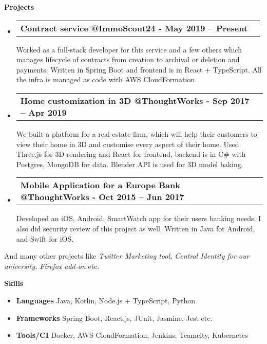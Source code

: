 \documentclass[letterpaper,12pt]{article}[leftmargin=*]
\makeatletter
\def \entryspacing {-0pt}
\renewcommand{\section}[2]{\vspace{5pt}
  \colorbox{secondary}{\color{white}\raggedbottom\normalsize\textbf{{#1}{\hspace{7pt}#2}}}
}
\newcommand{\resumeEntryStart}{\begin{itemize}[leftmargin=2.5mm]}
\newcommand{\resumeEntryEnd}{\end{itemize}\vspace{\entryspacing}}
\newcommand{\resumeEntryTD}[2]{
  \vspace{-1pt}\item[]
    \begin{tabularx}{0.97\textwidth}{X@{\hspace{60pt}}r}
      \textbf{\color{primary}#1} & {\firabook\color{accent}\small#2} \\
    \end{tabularx}\vspace{-6pt}
}
\newcommand{\resumeEntryS}[2]{
  \item[]\small{
    \textbf{\color{primary}#1 }{ #2 \vspace{-6pt}}
  }
}
\makeatother
\begin{document}
\section{\faFlask}{Projects}

  \resumeEntryStart
    \resumeEntryTD
      {Contract service @ImmoScout24 {\normalfont - May 2019 -- Present}}{}
      \begin{flushleft}\small
      Worked as a full-stack developer for this service and a few others which manages lifecycle of contracts from creation to archival or deletion and payments. Written in Spring Boot and frontend is in React + TypeScript. All the infra is managed as code with AWS CloudFormation.
      \end{flushleft}
  \resumeEntryEnd

  \resumeEntryStart
    \resumeEntryTD
      {Home customization in 3D @ThoughtWorks {\normalfont - Sep 2017 -- Apr 2019}}{}
      \begin{flushleft}\small
      We built a platform for a real-estate firm, which will help their customers to view their home in 3D and customise every aspect of their home. Used Three.js for 3D rendering and React for frontend, backend is in C\# with Postgres, MongoDB for data. Blender API is used for 3D model baking.
      \end{flushleft}
  \resumeEntryEnd

  \resumeEntryStart
    \resumeEntryTD
      {Mobile Application for a Europe Bank @ThoughtWorks {\normalfont - Oct 2015 -- Jun 2017}}{}
    \begin{flushleft}\small
    Developed an iOS, Android, SmartWatch app for their users banking needs. I also did security review of this project as well. Written in Java for Android, and Swift for iOS.
    \end{flushleft}
  \resumeEntryEnd

  \begin{adjustwidth}{2.5mm}{2.5mm}\small
  {And many other projects like \textit{Twitter Marketing tool, Central Identity for our university, Firefox add-on} etc.}
  \end{adjustwidth}
  \vspace{4pt}

\section{\faGears}{Skills}
  \resumeEntryStart
  \resumeEntryS{Languages} {Java, Kotlin, Node.js + TypeScript, Python}
  \resumeEntryS{Frameworks} {Spring Boot, React.js, JUnit, Jasmine, Jest etc.}
  \resumeEntryS{Tools/CI} {Docker, AWS CloudFormation, Jenkins, Teamcity, Kubernetes}
  \resumeEntryEnd
\end{document}
